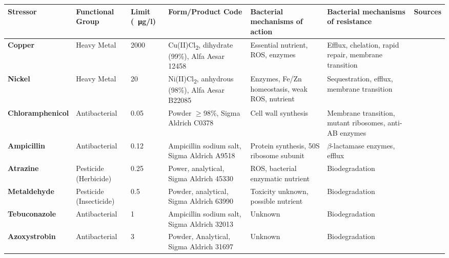 \documentclass[final,1p,times]{elsarticle}
\begin{document}
\begin{landscape}
\begin{table}[h]
\begin{threeparttable}
\small
\setlength{\tabcolsep}{4pt}
\setlength{\extrarowheight}{3pt}
\begin{tabular}{l M l K K K c}
\toprule
\textbf{Stressor} & \textbf{Functional Group} & \textbf{Limit (\SI{}{\ug}/l}) & \textbf{Form/Product Code} & \textbf{Bacterial mechanisms of action} & \textbf{Bacterial mechanisms of resistance} & \textbf{Sources} \\
\midrule
{}\textbf{Copper} & Heavy Metal & 2000 & Cu(II)Cl\textsubscript{2}, dihydrate (99\%), Alfa Aesar 12458 & Essential nutrient, ROS, enzymes & Efflux, chelation, rapid repair, membrane transition & \cite{Nayar2004EnvironmentalMesocosms,Valko2005,Dupont2011,ECHA2018Cu} \\
\textbf{Nickel} & Heavy Metal & 20 & Ni(II)Cl\textsubscript{2}, anhydrous (98\%), Alfa Aesar B22085 & Enzymes, Fe/Zn homeostasis, weak ROS, nutrient & Sequestration, efflux, membrane transition & \cite{Nayar2004EnvironmentalMesocosms,Macomber2011,Nishimura1998,Zamble2015} \\
\textbf{Chloramphenicol} & Antibacterial & 0.05 & Powder $\geqslant$98\%, Sigma Aldrich C0378 & Cell wall synthesis & Membrane transition, mutant ribosomes, anti-AB enzymes & \cite{Shaw1979,Rebstock1949,Toku-E2018Ch,Ruiz1999MechanismsFish} \\
\textbf{Ampicillin} & Antibacterial & 0.12 & Ampicillin sodium salt, Sigma Aldrich A9518 & Protein synthesis, 50S ribosome subunit & $\beta$-lactamase enzymes, efflux & \cite{Ruiz1999MechanismsFish,Costanzo2005} \\
\textbf{Atrazine} & Pesticide (Herbicide) & 0.25 & Power, analytical, Sigma Aldrich 45330 & ROS, bacterial enzymatic nutrient & Biodegradation & \cite{Shimabukuro1969,Delorenzo2001,Zhang2012} \\
\textbf{Metaldehyde} & Pesticide \break (Insecticide) & 0.5 & Powder, analytical, Sigma Aldrich 63990 & Toxicity unknown, possible nutrient & Biodegradation & \cite{Kay2014,Castle2017,Thomas2017} \\
\textbf{Tebuconazole} & Antibacterial & 1 & Ampicillin sodium salt, Sigma Aldrich 32013 & Unknown & Biodegradation & \cite{Sehnem2010,Artigas2014ComparativeEcosystems} \\
\textbf{Azoxystrobin} & Antibacterial & 3 & Powder, Analytical, Sigma Aldrich 31697 & Unknown & Biodegradation & \cite{Battaglin2011Occurrence20052006,Rodrigues2013,Loos2010,Bacmaga2015MicrobialAzoxystrobin} \\

\end{tabular}
\end{threeparttable}
\end{table}
\end{landscape}
\end{document}
